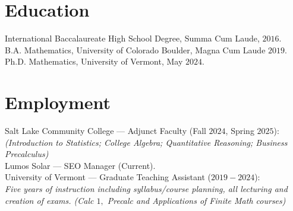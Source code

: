\documentclass[letterpaper]{article}
\begin{document}
	\thispagestyle{firststyle}
	\section*{Education}
	
	\noindent International Baccalaureate High School Degree, Summa Cum Laude, $2016.$\\
	
	\noindent B.A. Mathematics, University of Colorado Boulder, Magna Cum Laude $2019.$\\
	
	\noindent Ph.D. Mathematics, University of Vermont, May $2024.$ 
	
	\section*{Employment}
	\noindent Salt Lake Community College --- Adjunct Faculty (Fall $2024$, Spring $2025$):\\
	\textit{(Introduction to Statistics; College Algebra; Quantitative Reasoning; Business Precalculus)}\\
	
	\noindent Lumos Solar --- SEO Manager (Current).\\
	
	\noindent University of Vermont --- Graduate Teaching Assistant ($2019-2024$):\\
	\textit{Five years of instruction including syllabus/course planning, all lecturing and creation of exams. (Calc $1,$ Precalc and Applications of Finite Math courses)}
	
\end{document}
